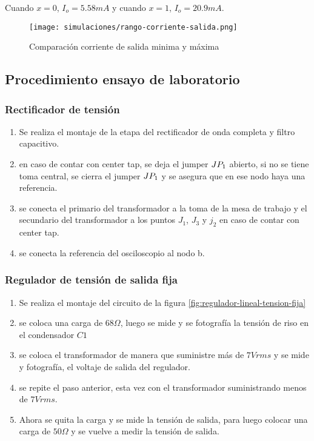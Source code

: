 Cuando $x=0$, $I_o = 5.58 mA$ y cuando $x=1$, $I_o = 20.9mA$.

\begin{figure}[ht]
    \centering
    \texttt{[image: simulaciones/rango-corriente-salida.png]}
    \caption{Comparación corriente de salida minima y máxima}
    \label{fig:rango-corriente-salida}
\end{figure}

\subsection{Procedimiento ensayo de laboratorio}

\subsubsection{Rectificador de tensión}

\begin{enumerate}
    \item Se realiza el montaje de la etapa del rectificador de onda completa y filtro capacitivo.
    \item en caso de contar con center tap, se deja el jumper $JP_{1}$ abierto, si no se tiene toma central, se cierra el jumper $JP_{1}$ y se asegura que en ese nodo haya una referencia.
    \item se conecta el primario del transformador a la toma de la mesa de trabajo y el secundario del transformador a los puntos $J_1$, $J_3$ y $j_2$ en caso de contar con center tap.
    \item se conecta la referencia del osciloscopio al nodo b.
\end{enumerate}

\subsubsection{Regulador de tensión de salida fija}

\begin{enumerate}
    \item Se realiza el montaje del circuito de la figura \ref{fig:regulador-lineal-tension-fija}
    \item se coloca una carga de $68 \Omega$, luego se mide y se fotografía la tensión de riso en el condensador $C1$ 
    \item se coloca el transformador de manera que suministre más de $7Vrms$ y se mide y fotografía, el voltaje de salida del regulador.
    \item se repite el paso anterior, esta vez con el transformador suministrando menos de $7Vrms$.
    \item Ahora se quita la carga y se mide la tensión de salida, para luego colocar una carga de $50 \Omega$ y se vuelve a medir la tensión de salida.
\end{enumerate}


